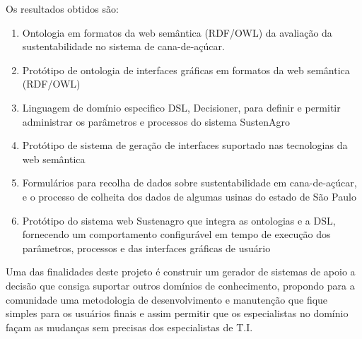 Os resultados obtidos são: 
\begin{enumerate}
\item Ontologia em formatos da web semântica (RDF/OWL) da avaliação da sustentabilidade
no sistema de cana-de-açúcar. 
\item Protótipo de ontologia de interfaces gráficas em formatos da web semântica
(RDF/OWL) 
\item Linguagem de domínio especifico DSL, Decisioner, para definir e permitir
administrar os parâmetros e processos do sistema SustenAgro 
\item Protótipo de sistema de geração de interfaces suportado nas tecnologias
da web semântica 
\item Formulários para recolha de dados sobre sustentabilidade em cana-de-açúcar,
e o processo de colheita dos dados de algumas usinas do estado de
São Paulo 
\item Protótipo do sistema web Sustenagro que integra as ontologias e a
DSL, fornecendo um comportamento configurável em tempo de execução
dos parâmetros, processos e das interfaces gráficas de usuário
\end{enumerate}
Uma das finalidades deste projeto é construir um gerador de sistemas
de apoio a decisão que consiga suportar outros domínios de conhecimento,
propondo para a comunidade uma metodologia de desenvolvimento e manutenção
que fique simples para os usuários finais e assim permitir que os
especialistas no domínio façam as mudanças sem precisas dos especialistas
de T.I.
